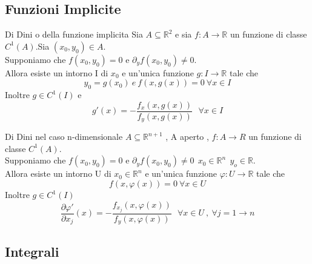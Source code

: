 \documentclass{article}
\theoremstyle{definition}
\newcommand{\R}{\mathbb{R}}
\newcommand{\Rn}{\R^n}
\begin{document}
	\subsection{Funzioni Implicite}
	\begin{teo}{Di Dini o della funzione implicita}{}
		Sia $A \subseteq \R^2$ e sia $f: A \rightarrow \R$ un funzione di classe $C^1(A)$.Sia $(x_0,y_0)\in A$. \\Supponiamo che $f(x_0,y_0)=0$ e $\partial_yf(x_0,y_0)\neq 0$.\\
		Allora esiste un intorno I di $x_0$ e un'unica funzione $g : I \rightarrow \R$ tale che 
		$$y_0=g(x_0) \ e \ f(x,g(x))=0 \ \forall x \in I$$
		Inoltre $g\in C^1(I)$ e $$g'(x)=-\frac{f_x(x,g(x))}{f_y(x,g(x))}\ \ \ \forall x \in I$$
	\end{teo}
	\begin{teo}{Di Dini nel caso n-dimensionale  }{}
		$A \subseteq \R^{n+1}$ , A aperto , $f: A \rightarrow R$  un funzione di classe $C^1(A)$.  \\Supponiamo che $f(x_0,y_0)=0$ e $\partial_yf(x_0,y_0)\neq 0 \ \ x_0 \in \Rn \ \ y_o \in \R$.\\
		Allora esiste un intorno U di $x_0 \in \Rn$ e un'unica funzione $\varphi : U\rightarrow \R$ tale che  $$f(x,\varphi(x))=0 \ \forall x \in U$$
		Inoltre $g\in C^1(I)$ 
		$$\frac{\partial\varphi '}{\partial x_j}(x)=-\frac{f_{x_j}(x,\varphi(x))}{f_y(x,\varphi(x))}\ \ \ \forall x \in U \ , \ \forall j=1\rightarrow n$$
	\end{teo}
	\subsection{Integrali}
\end{document}
